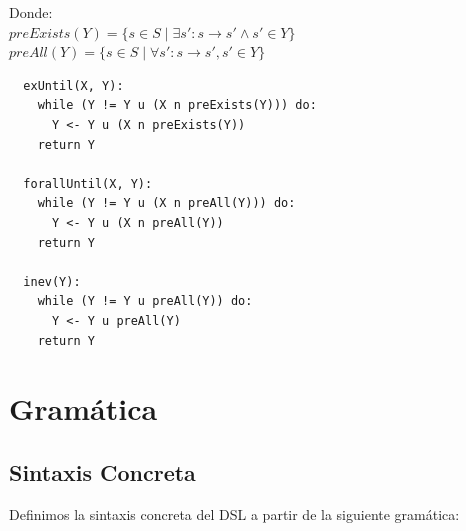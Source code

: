 \documentclass[11pt]{article}
\begin{document}
Donde: \\

$preExists(Y) = \{s \in S \; | \; \exists s' : s \rightarrow s' \land s' \in Y\}$ \\
$preAll(Y) = \{s \in S \; | \; \forall s' : s \rightarrow s', s' \in Y\}$

\begin{verbatim}
  exUntil(X, Y):
    while (Y != Y u (X n preExists(Y))) do:
      Y <- Y u (X n preExists(Y))
    return Y
    
  forallUntil(X, Y):
    while (Y != Y u (X n preAll(Y))) do:
      Y <- Y u (X n preAll(Y))
    return Y

  inev(Y):
    while (Y != Y u preAll(Y)) do:
      Y <- Y u preAll(Y)
    return Y
\end{verbatim}

\section{Gramática}

\subsection{Sintaxis Concreta}
  Definimos la sintaxis concreta del DSL a partir de la siguiente gramática:
\end{document}
